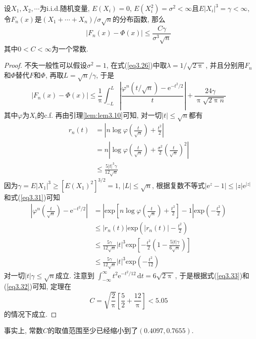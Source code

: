 \documentclass[cn, 12pt, math=mtpro2, bibstyle=apa, blue, twocol]{elegantbook}
\begin{document}
\begin{theorem}
  设$X_1,X_2,\cdots$为i.i.d.随机变量, $E(X_i)=0$, $E(X_i^2)=\sigma^2<\infty$且$E|X_i|^3=\gamma<\infty$, 令$F_n(x)$是$(X_1+\cdots+X_n)/\sigma\sqrt{n}$的分布函数, 那么
  $$|F_n(x)-\Phi(x)|\leq\frac{C\gamma}{\sigma^3\sqrt{n}}$$
  其中$0<C<\infty$为一个常数.
\end{theorem}
\begin{proof}
不失一般性可以假设$\sigma^2=1$, 在式(\ref{eq3.26})中取$\lambda=1/\sqrt{2\uppi}$, 并且分别用$F_n$和$\Phi$替代$F$和$\Phi$, 再取$L=\sqrt{n}/\gamma$, 于是
\begin{equation}\label{eq3.33}
  |F_n(x)-\Phi(x)|\leq \frac{1}{\uppi}\int_{-L}^{L}\left|\frac{\varphi^n(t/\sqrt{n})-\text{e}^{-t^2/2}}{t}\right|+\frac{24\gamma}{\uppi\sqrt{2\uppi n}}
\end{equation}
其中$\varphi$为$X_i$的c.f. 再由引理\ref{lem:lem3.10}可知, 对一切$|t|\leq \sqrt{n}$都有
\begin{align}
r_n(t)&=\left|n\log\varphi\left(\frac{t}{\sqrt{n}}\right)+\frac{t^2}{2}\right| \nonumber \\
&=n\left|\log\varphi\left(\frac{t}{\sqrt{n}}\right)+\frac{\sigma^2}{2}\left(\frac{t}{\sqrt{n}}\right)^2 \right| \nonumber \\
&\leq \frac{5|t|^3\gamma}{12\sqrt{n}} \label{eq3.31}
\end{align}
因为$\gamma=E|X_1|^3\geq [E(X_1)^2]^{3/2}=1$, $|L|\leq \sqrt{n}$, 根据复数不等式$|\text{e}^z-1|\leq |z|\text{e}^{|z|}$和式(\ref{eq3.31})可知
\begin{align}
\left|\varphi^n\left(\frac{t}{\sqrt{n}}\right)-\text{e}^{-t^2/2} \right|&=\left|\text{exp}\left[n\log\varphi\left(\frac{t}{\sqrt{n}}\right)+\frac{t^2}{2}\right]-1\right|\text{exp}\left(-\frac{t^2}{2}\right) \nonumber \\
&\leq |r_n(t)|\text{exp}\left(|r_n(t)|-\frac{t^2}{2}\right) \nonumber \\
&\leq \frac{5\gamma}{12\sqrt{n}}|t|^3\text{exp}\left[-\frac{t^2}{2}\left(1-\frac{5|t|\gamma}{6\sqrt{n}}\right)\right] \nonumber \\
&\leq \frac{5\gamma}{12\sqrt{n}}|t|^3\text{exp}\left(-\frac{t^2}{12}\right) \label{eq3.32}
\end{align}
对一切$|t|\gamma\leq \sqrt{n}$成立. 注意到
$\int_{-\infty}^{\infty}t^2\text{e}^{-t^2/12}\,\text{d}t=6\sqrt{2\uppi}$, 于是根据式(\ref{eq3.33})和(\ref{eq3.32})可知, 定理在
$$C=\sqrt{\frac{2}{\uppi}}\left[\frac{5}{2}+\frac{12}{\uppi}\right]<5.05$$
的情况下成立.
\end{proof}
\begin{remark}
事实上, 常数$C$的取值范围至少已经缩小到了$(0.4097,0.7655)$.
\end{remark}
\end{document}
